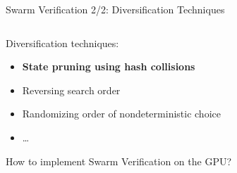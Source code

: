 \documentclass[aspectratio=169]{beamer}
\begin{document}
\begin{frame}{Swarm Verification 2/2: Diversification Techniques}
    \begin{columns}
        \begin{column}{.5\textwidth}
            Diversification techniques:

            \begin{itemize}
                \item \textbf{State pruning using hash collisions}
                \item Reversing search order
                \item Randomizing order of nondeterministic choice
                \item \dots
            \end{itemize}

            How to implement Swarm Verification on the GPU?
        \end{column}
        \begin{column}{.5\textwidth}
            \begin{figure}
                \begin{subfigure}[b]{.49\textwidth}
\end{subfigure}
\end{figure}
\end{column}
\end{columns}
\end{frame}
\end{document}
